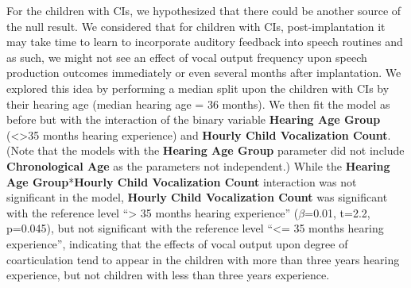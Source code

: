 \documentclass[
]{article}
\begin{document}
For the children with CIs, we hypothesized that there could be another source of the null result. We considered that for children with CIs, post-implantation it may take time to learn to incorporate auditory feedback into speech routines and as such, we might not see an effect of vocal output frequency upon speech production outcomes immediately or even several months after implantation. We explored this idea by performing a median split upon the children with CIs by their hearing age (median hearing age = 36 months). We then fit the model as before but with the interaction of the binary variable \textbf{Hearing Age Group} (\textless\textgreater35 months hearing experience) and \textbf{Hourly Child Vocalization Count}. (Note that the models with the \textbf{Hearing Age Group} parameter did not include \textbf{Chronological Age} as the parameters not independent.) While the \textbf{Hearing Age Group}*\textbf{Hourly Child Vocalization Count} interaction was not significant in the model, \textbf{Hourly Child Vocalization Count} was significant with the reference level ``\textgreater{} 35 months hearing experience'' (\(\beta\)=0.01, t=2.2, p=0.045), but not significant with the reference level ``\textless= 35 months hearing experience'', indicating that the effects of vocal output upon degree of coarticulation tend to appear in the children with more than three years hearing experience, but not children with less than three years experience.
\end{document}

